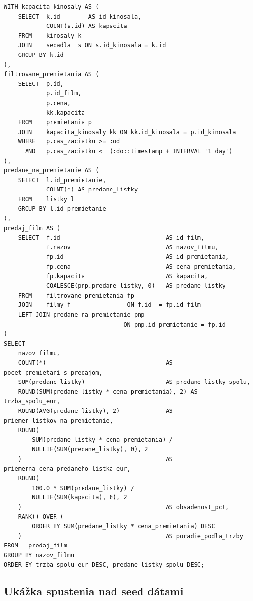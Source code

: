 \documentclass[11pt, a4paper]{article}
\begin{document}
\begin{lstlisting}[caption={Analytický dopyt: predajnosť filmov za zvolené obdobie}]
WITH kapacita_kinosaly AS (
    SELECT  k.id        AS id_kinosala,
            COUNT(s.id) AS kapacita
    FROM    kinosaly k
    JOIN    sedadla  s ON s.id_kinosala = k.id
    GROUP BY k.id
),
filtrovane_premietania AS (
    SELECT  p.id,
            p.id_film,
            p.cena,
            kk.kapacita
    FROM    premietania p
    JOIN    kapacita_kinosaly kk ON kk.id_kinosala = p.id_kinosala
    WHERE   p.cas_zaciatku >= :od
      AND   p.cas_zaciatku <  (:do::timestamp + INTERVAL '1 day')
),
predane_na_premietanie AS (
    SELECT  l.id_premietanie,
            COUNT(*) AS predane_listky
    FROM    listky l
    GROUP BY l.id_premietanie
),
predaj_film AS (
    SELECT  f.id                              AS id_film,
            f.nazov                           AS nazov_filmu,
            fp.id                             AS id_premietania,
            fp.cena                           AS cena_premietania,
            fp.kapacita                       AS kapacita,
            COALESCE(pnp.predane_listky, 0)   AS predane_listky
    FROM    filtrovane_premietania fp
    JOIN    filmy f                ON f.id  = fp.id_film
    LEFT JOIN predane_na_premietanie pnp
                                  ON pnp.id_premietanie = fp.id
)
SELECT
    nazov_filmu,
    COUNT(*)                                  AS pocet_premietani_s_predajom,
    SUM(predane_listky)                       AS predane_listky_spolu,
    ROUND(SUM(predane_listky * cena_premietania), 2) AS trzba_spolu_eur,
    ROUND(AVG(predane_listky), 2)             AS priemer_listkov_na_premietanie,
    ROUND(
        SUM(predane_listky * cena_premietania) /
        NULLIF(SUM(predane_listky), 0), 2
    )                                         AS priemerna_cena_predaneho_listka_eur,
    ROUND(
        100.0 * SUM(predane_listky) /
        NULLIF(SUM(kapacita), 0), 2
    )                                         AS obsadenost_pct,
    RANK() OVER (
        ORDER BY SUM(predane_listky * cena_premietania) DESC
    )                                         AS poradie_podla_trzby
FROM   predaj_film
GROUP BY nazov_filmu
ORDER BY trzba_spolu_eur DESC, predane_listky_spolu DESC;
\end{lstlisting}

\subsection{Ukážka spustenia nad seed dátami}
\end{document}
